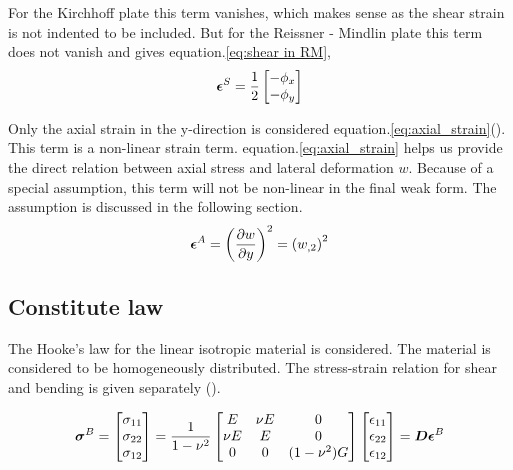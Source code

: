 \documentclass[main.tex]{subfiles}
\begin{document}
For the Kirchhoff plate this term vanishes, which makes sense as the shear strain is not indented to be included. But for the Reissner - Mindlin plate this term does not vanish and gives equation.\ref{eq:shear in RM}, 
\begin{align}\label{eq:shear in RM}
\boldsymbol{\epsilon}^S = \dfrac{1}{2}
\begin{bmatrix}
-\phi_x
\\
-\phi_y
\end{bmatrix}
\end{align}

Only the axial strain in the y-direction is considered  equation.\ref{eq:axial_strain}(\cite{JianLi2012}). This term is a non-linear strain term. equation.\ref{eq:axial_strain} helps us provide the direct relation between axial stress and lateral deformation $w$.  Because of a special assumption, this term will not be non-linear in the final weak form. The assumption is discussed in the following section. 
\begin{align}\label{eq:axial_strain}
\boldsymbol{\epsilon}^A = 
 \left( \dfrac{\partial w}{\partial y} \right)^2
 =
 \left( w_{,2} \right)^2
\end{align}


\subsection{Constitute law}

The Hooke's law for the linear isotropic material is considered. The material is considered to be homogeneously distributed. The stress-strain relation for shear and bending is given separately (\cite{ShellsandPlates_Gould}).

\begin{equation}
\boldsymbol{\sigma}^B = \begin{bmatrix}
\sigma_{11}
\\
\sigma_{22}
\\
 \sigma_{12}
\end{bmatrix}
=\dfrac{1}{1-\nu^2}
\begin{bmatrix}
E & \nu E & 0
\\
\nu E & E & 0
\\
0 & 0 & (1-\nu^2)G
\end{bmatrix}
\begin{bmatrix}
\epsilon_{11}
\\
\epsilon_{22}
\\
 \epsilon_{12}
\end{bmatrix}
=
\boldsymbol{D}
\boldsymbol{ \epsilon}^B
\end{equation}
\end{document}
